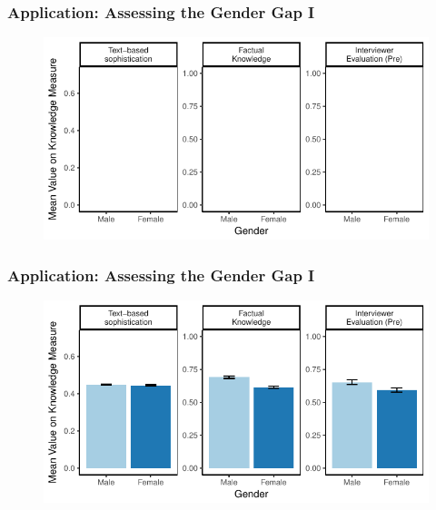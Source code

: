 \documentclass{beamer}
\begin{document}
\begin{frame} %
\frametitle{Application: Assessing the Gender Gap I}
  \begin{figure}
  \includegraphics{../fig/meandiff_empty.pdf}
  \end{figure}
\end{frame}
\begin{frame} %
\frametitle{Application: Assessing the Gender Gap I}
  \begin{figure}
  \includegraphics{../fig/meandiff_pres.pdf}
  \end{figure}
\end{frame}
\end{document}

